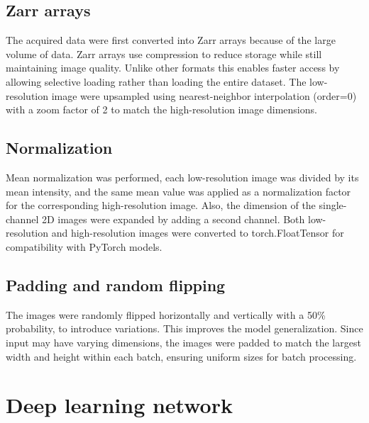 \documentclass[twocolumn]{article}
\begin{document}
\subsection{Zarr arrays}

The acquired data were first converted into Zarr arrays because of the large volume of data. Zarr arrays use compression to reduce storage while still maintaining image quality. 
Unlike other formats this enables faster access by allowing selective loading rather than loading the entire dataset. 
The low-resolution image were upsampled using nearest-neighbor interpolation (order=0) with a zoom factor of 2 to match the high-resolution image dimensions. 

\subsection{Normalization}

Mean normalization was performed, each low-resolution image was divided by its mean intensity, and the same mean value was applied as a normalization factor for the corresponding high-resolution image.  
Also, the dimension of the single-channel 2D images were expanded by adding a second channel. Both low-resolution and high-resolution images were converted to torch.FloatTensor for compatibility with PyTorch models.

\subsection{Padding and random flipping}
The images were randomly flipped horizontally and vertically with a 50\% probability, to introduce variations. 
This improves the model generalization. Since input may have varying dimensions, the images were padded to match the largest width and height within each batch, ensuring uniform sizes for batch processing.


\section{Deep learning network}
\end{document}
